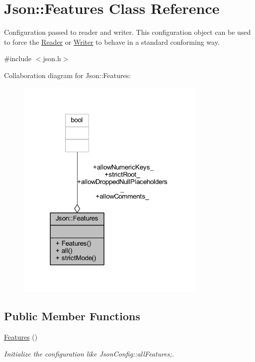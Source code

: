 \hypertarget{class_json_1_1_features}{}\section{Json\+:\+:Features Class Reference}
\label{class_json_1_1_features}


Configuration passed to reader and writer. This configuration object can be used to force the \hyperlink{class_json_1_1_reader}{Reader} or \hyperlink{class_json_1_1_writer}{Writer} to behave in a standard conforming way.  




{\ttfamily \#include $<$json.\+h$>$}



Collaboration diagram for Json\+:\+:Features\+:\nopagebreak
\begin{figure}[H]
\begin{center}
\leavevmode
\includegraphics[width=258pt]{class_json_1_1_features__coll__graph}
\end{center}
\end{figure}
\subsection*{Public Member Functions}
\begin{DoxyCompactItemize}
\item 
\hyperlink{class_json_1_1_features_ad15a091cb61bb31323299a95970d2644}{Features} ()
\begin{DoxyCompactList}\small\item\em Initialize the configuration like Json\+Config\+::all\+Features;. \end{DoxyCompactList}\end{DoxyCompactItemize}
